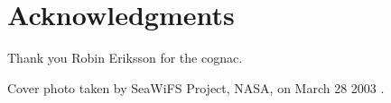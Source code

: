 \section*{Acknowledgments}
Thank you Robin Eriksson for the cognac.

\vspace*{\fill}
Cover photo taken by SeaWiFS Project, NASA, on March 28 2003 \cite{HazeEurope2003}. 
